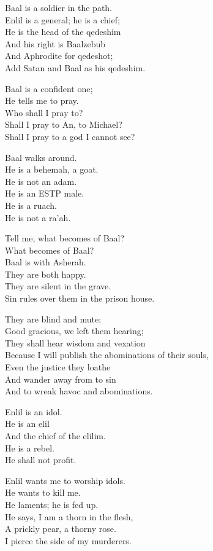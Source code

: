 \documentclass[
]{book}
\begin{document}
Baal is a soldier in the path.\\
Enlil is a general; he is a chief;\\
He is the head of the qedeshim\\
And his right is Baalzebub\\
And Aphrodite for qedeshot;\\
Add Satan and Baal as his qedeshim.

Baal is a confident one;\\
He tells me to pray.\\
Who shall I pray to?\\
Shall I pray to An, to Michael?\\
Shall I pray to a god I cannot see?

Baal walks around.\\
He is a behemah, a goat.\\
He is not an adam.\\
He is an ESTP male.\\
He is a ruach.\\
He is not a ra'ah.

Tell me, what becomes of Baal?\\
What becomes of Baal?\\
Baal is with Asherah.\\
They are both happy.\\
They are silent in the grave.\\
Sin rules over them in the prison house.

They are blind and mute;\\
Good gracious, we left them hearing;\\
They shall hear wisdom and vexation\\
Because I will publish the abominations of their souls,\\
Even the justice they loathe\\
And wander away from to sin\\
And to wreak havoc and abominations.

Enlil is an idol.\\
He is an elil\\
And the chief of the elilim.\\
He is a rebel.\\
He shall not profit.

Enlil wants me to worship idols.\\
He wants to kill me.\\
He laments; he is fed up.\\
He says, I am a thorn in the flesh,\\
A prickly pear, a thorny rose.\\
I pierce the side of my murderers.
\end{document}

